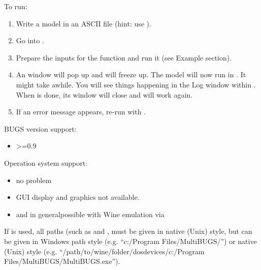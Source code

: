 \begin{Details}\relax
To run:
\begin{enumerate}

\item Write a  model in an ASCII file (hint: use
).
\item Go into \R{}.
\item Prepare the inputs for the  function and run it (see
Example section).
\item An  window will pop up and \R{} will freeze
up. The model will now run in . It might take awhile. You
will see things happening in the Log window within . When
 is done, its window will close and \R{} will work
again.
\item If an error message appears, re-run with .

\end{enumerate}


BUGS version support:
\begin{itemize}

\item {} >=0.9

\end{itemize}


Operation system support:
\begin{itemize}

\item {}no problem
\item {}GUI display and graphics not available.
\item {} and  in
generalpossible with Wine emulation via 

\end{itemize}


If  is used, all paths (such as
 and , must be given in
native (Unix) style, but  can be given in
Windows path style (e.g. ``c:/Program Files/MultiBUGS/'') or
native (Unix) style
(e.g. ``/path/to/wine/folder/dosdevices/c:/Program
Files/MultiBUGS/MultiBUGS.exe'').

\end{Details}
%
